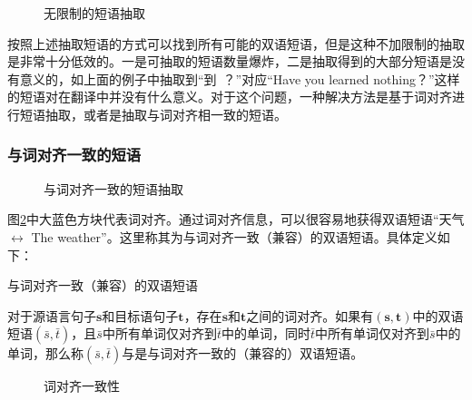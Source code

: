 \begin{figure}[htp]
\centering

\caption{无限制的短语抽取}
\label{fig:4-12}
\end{figure}

\parinterval 按照上述抽取短语的方式可以找到所有可能的双语短语，但是这种不加限制的抽取是非常十分低效的。一是可抽取的短语数量爆炸，二是抽取得到的大部分短语是没有意义的，如上面的例子中抽取到``到\ ？''对应``Have you learned nothing？''这样的短语对在翻译中并没有什么意义。对于这个问题，一种解决方法是基于词对齐进行短语抽取，或者是抽取与词对齐相一致的短语。


\subsubsection{与词对齐一致的短语}

\begin{figure}[htp]
\centering

\caption{与词对齐一致的短语抽取}
\label{fig:4-13}
\end{figure}

\parinterval 图\ref{fig:4-13}中大蓝色方块代表词对齐。通过词对齐信息，可以很容易地获得双语短语``天气 $\leftrightarrow$ The weather''。这里称其为与词对齐一致（兼容）的双语短语。具体定义如下：

\vspace{0.5em}
\begin{definition} 与词对齐一致（兼容）的双语短语

{\small
对于源语言句子$\mathbf{s}$和目标语句子$\mathbf{t}$，存在$\mathbf{s}$和$\mathbf{t}$之间的词对齐。如果有$(\mathbf{s},\mathbf{t})$中的双语短语$(\bar{s},\bar{t})$，且$\bar{s}$中所有单词仅对齐到$\bar{t}$中的单词，同时$\bar{t}$中所有单词仅对齐到$\bar{s}$中的单词，那么称$(\bar{s},\bar{t})$与是与词对齐一致的（兼容的）双语短语。
}
\end{definition}

\begin{figure}[htp]
\centering

\caption{词对齐一致性}
\label{fig:4-14}
\end{figure}

